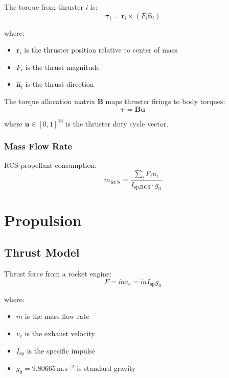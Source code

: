 \documentclass[11pt,a4paper]{article}
\newcommand{\vect}[1]{\bm{#1}}
\newcommand{\mat}[1]{\mathbf{#1}}
\newcommand{\SI}[2]{#1\,\mathrm{#2}}
\begin{document}
The torque from thruster $i$ is:
\begin{equation}
    \vect{\tau}_i = \vect{r}_i \times (F_i \hat{\vect{n}}_i)
\end{equation}

where:
\begin{itemize}
    \item $\vect{r}_i$ is the thruster position relative to center of mass
    \item $F_i$ is the thrust magnitude
    \item $\hat{\vect{n}}_i$ is the thrust direction
\end{itemize}

The torque allocation matrix $\mat{B}$ maps thruster firings to body torques:
\begin{equation}
    \vect{\tau} = \mat{B} \vect{u}
\end{equation}

where $\vect{u} \in [0,1]^{16}$ is the thruster duty cycle vector.

\subsubsection{Mass Flow Rate}

RCS propellant consumption:
\begin{equation}
    \dot{m}_\text{RCS} = \frac{\sum_i F_i u_i}{I_\text{sp,RCS} \cdot g_0}
\end{equation}

\section{Propulsion}

\subsection{Thrust Model}

Thrust force from a rocket engine:
\begin{equation}
    F = \dot{m} v_e = \dot{m} I_\text{sp} g_0
\end{equation}

where:
\begin{itemize}
    \item $\dot{m}$ is the mass flow rate
    \item $v_e$ is the exhaust velocity
    \item $I_\text{sp}$ is the specific impulse
    \item $g_0 = \SI{9.80665}{m.s^{-2}}$ is standard gravity
\end{itemize}
\end{document}
